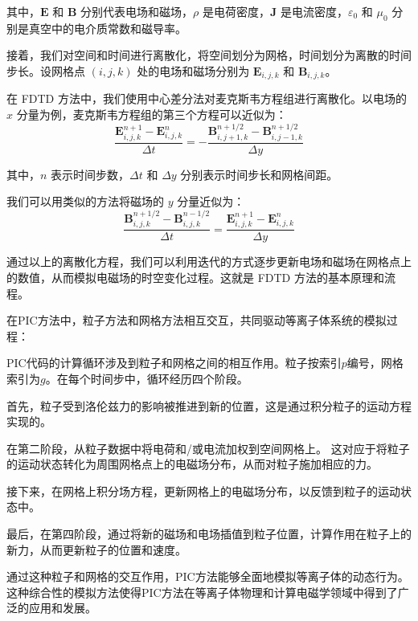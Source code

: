 其中，$\mathbf{E}$ 和 $\mathbf{B}$ 分别代表电场和磁场，$\rho$ 是电荷密度，$\mathbf{J}$ 是电流密度，$\varepsilon_0$ 和 $\mu_0$ 分别是真空中的电介质常数和磁导率。

接着，我们对空间和时间进行离散化，将空间划分为网格，时间划分为离散的时间步长。设网格点 $(i, j, k)$ 处的电场和磁场分别为 $\mathbf{E}_{i,j,k}$ 和 $\mathbf{B}_{i,j,k}$。

在 FDTD 方法中，我们使用中心差分法对麦克斯韦方程组进行离散化。以电场的 $x$ 分量为例，麦克斯韦方程组\cite{Meagher_2020}的第三个方程可以近似为：
\begin{equation}
    \displaystyle\frac{\mathbf{E}_{i,j,k}^{n+1} - \mathbf{E}_{i,j,k}^{n}}{\Delta t} = -\frac{\mathbf{B}_{i,j+1,k}^{n+1/2} - \mathbf{B}_{i,j-1,k}^{n+1/2}}{\Delta y}
\end{equation}

其中，$n$ 表示时间步数，$\Delta t$ 和 $\Delta y$ 分别表示时间步长和网格间距。

我们可以用类似的方法将磁场的 $y$ 分量近似为：
\begin{equation}
    \displaystyle\frac{\mathbf{B}_{i,j,k}^{n+1/2} - \mathbf{B}_{i,j,k}^{n-1/2}}{\Delta t} = \frac{\mathbf{E}_{i,j,k}^{n+1} - \mathbf{E}_{i,j,k}^{n}}{\Delta y}
\end{equation}

通过以上的离散化方程，我们可以利用迭代的方式逐步更新电场和磁场在网格点上的数值，从而模拟电磁场的时空变化过程。这就是 FDTD 方法的基本原理和流程。

在PIC方法中，粒子方法和网格方法相互交互，共同驱动等离子体系统的模拟过程：

PIC代码的计算循环涉及到粒子和网格之间的相互作用。粒子按索引$p$编号，网格索引为$g$。在每个时间步中，循环经历四个阶段。

首先，粒子受到洛伦兹力的影响被推进到新的位置，这是通过积分粒子的运动方程实现的。

在第二阶段，从粒子数据中将电荷和/或电流加权到空间网格上。
这对应于将粒子的运动状态转化为周围网格点上的电磁场分布，从而对粒子施加相应的力。

接下来，在网格上积分场方程，更新网格上的电磁场分布，以反馈到粒子的运动状态中。

最后，在第四阶段，通过将新的磁场和电场插值到粒子位置，计算作用在粒子上的新力，从而更新粒子的位置和速度。

通过这种粒子和网格的交互作用，PIC方法能够全面地模拟等离子体的动态行为。
这种综合性的模拟方法使得PIC方法在等离子体物理和计算电磁学领域中\cite{graf2023finitedifference}得到了广泛的应用和发展。


